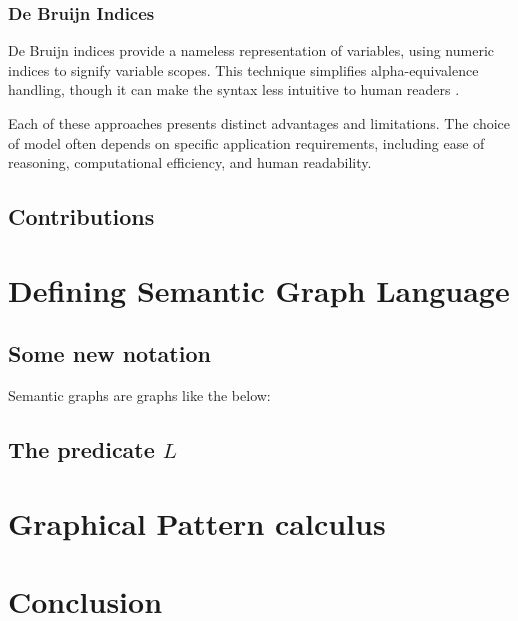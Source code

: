 \documentclass[a4paper,UKenglish,cleveref,autoref,thm-restate]{lipics-v2021}
\begin{document}
\subsubsection{De Bruijn Indices}
De Bruijn indices provide a nameless representation of variables, using numeric
indices to signify variable scopes. This technique simplifies alpha-equivalence
handling, though it can make the syntax less intuitive to human readers
\cite{bruijn72lambda}.

Each of these approaches presents distinct advantages and limitations. The
choice of model often depends on specific application requirements, including
ease of reasoning, computational efficiency, and human readability.

\subsection{Contributions}

\section{Defining Semantic Graph Language}

\subsection{Some new notation}

Semantic graphs are graphs like the below:


\subsection{The predicate $L$}

\section{Graphical Pattern calculus}

\section{Conclusion}

%
%
{}

\end{document}
